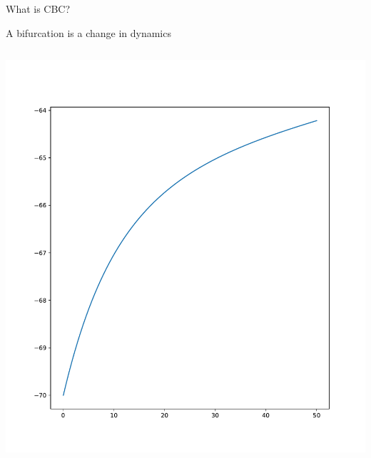 \documentclass[presentation]{beamer}
\begin{document}
\begin{frame}[label={sec:orgec05972}]{What is CBC?}
\begin{center}
A bifurcation is a change in dynamics
\end{center}
\begin{columns}
\begin{column}{0.5\columnwidth}
\begin{center}
\includegraphics[height=.8\textheight]{./excitable.pdf}
\end{center}
\end{column}


\end{columns}
\end{frame}
\end{document}
